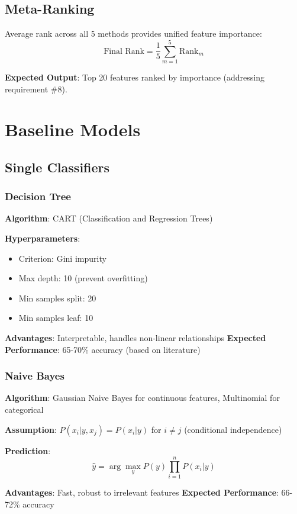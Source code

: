 \subsection{Meta-Ranking}

Average rank across all 5 methods provides unified feature importance:
$$\text{Final Rank} = \frac{1}{5} \sum_{m=1}^{5} \text{Rank}_m$$

\textbf{Expected Output}: Top 20 features ranked by importance (addressing requirement \#8).

\section{Baseline Models}

\subsection{Single Classifiers}

\subsubsection{Decision Tree}

\textbf{Algorithm}: CART (Classification and Regression Trees)

\textbf{Hyperparameters}:
\begin{itemize}
\item Criterion: Gini impurity
\item Max depth: 10 (prevent overfitting)
\item Min samples split: 20
\item Min samples leaf: 10
\end{itemize}

\textbf{Advantages}: Interpretable, handles non-linear relationships
\textbf{Expected Performance}: 65-70\% accuracy (based on literature)

\subsubsection{Naive Bayes}

\textbf{Algorithm}: Gaussian Naive Bayes for continuous features, Multinomial for categorical

\textbf{Assumption}: $P(x_i | y, x_j) = P(x_i | y)$ for $i \neq j$ (conditional independence)

\textbf{Prediction}:
$$\hat{y} = \arg\max_y P(y) \prod_{i=1}^{n} P(x_i | y)$$

\textbf{Advantages}: Fast, robust to irrelevant features
\textbf{Expected Performance}: 66-72\% accuracy

